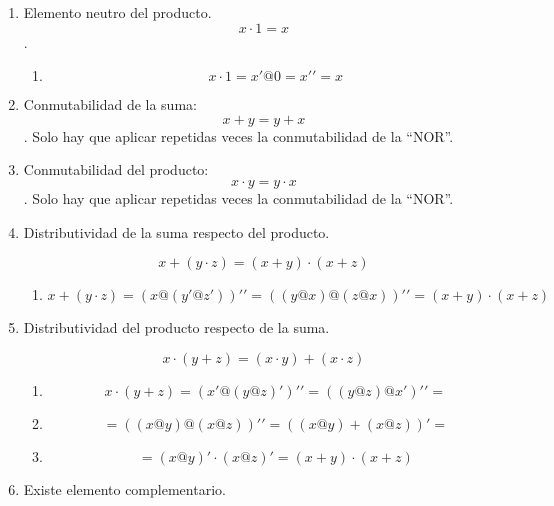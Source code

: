 \begin{enumerate}
\begin{enumerate}
\begin{enumerate}
\begin{enumerate}
\begin{enumerate}
          \begin{enumerate}
          \def\labelenumvi{\arabic{enumvi}.}
          \tightlist
          \item
            \[{{x + 0} = {({x@0})}}{' = {({x@0})}}@{{({x@x'})} =}\]
          \item
            \[{= {({x@0})}}@{0 = x}'@{0 = x}'{' = x}\]
          \end{enumerate}
        \item
          Elemento neutro del producto. \[{x \cdot 1} = x\].

          \begin{enumerate}
          \def\labelenumvi{\arabic{enumvi}.}
          \tightlist
          \item
            \[{{{x \cdot 1} = {x'@0}} = x}'{' = x}\]
          \end{enumerate}
        \item
          Conmutabilidad de la suma: \[{x + y} = {y + x}\]. Solo hay que
          aplicar repetidas veces la conmutabilidad de la ``NOR''.
        \item
          Conmutabilidad del producto: \[{x \cdot y} = {y \cdot x}\].
          Solo hay que aplicar repetidas veces la conmutabilidad de la
          ``NOR''.
        \item
          Distributividad de la suma respecto del producto.

          \[{x + {({y \cdot z})}} = {{({x + y})} \cdot {({x + z})}}\]

          \begin{enumerate}
          \def\labelenumvi{\arabic{enumvi}.}
          \tightlist
          \item
            \[{{x + {({y \cdot z})}} = {({x@{({y'@z'})}})}}'{' = {({{({y@x})}@{({z@x})}})}}'{' = {{({x + y})} \cdot {({x + z})}}}\]
          \end{enumerate}
        \item
          Distributividad del producto respecto de la suma.

          \[{x \cdot {({y + z})}} = {{({x \cdot y})} + {({x \cdot z})}}\]

          \begin{enumerate}
          \def\labelenumvi{\arabic{enumvi}.}
          \tightlist
          \item
            \[{{x \cdot {({y + z})}} = {({{x'}@{({y@z})}'})}}'{' = {({{({y@z})}@{x'}})}}'{' =}\]
          \item
            \[{= {({{({x@y})}@{({x@z})}})}}'{' = {({{({x@y})} + {({x@z})}})}}{' =}\]
          \item
            \[{= {({x@y})}}{' \cdot {({x@z})}}{' = {{({x + y})} \cdot {({x + z})}}}\]
          \end{enumerate}
        \item
          Existe elemento complementario.


\end{enumerate}
\end{enumerate}
\end{enumerate}
\end{enumerate}
\end{enumerate}
